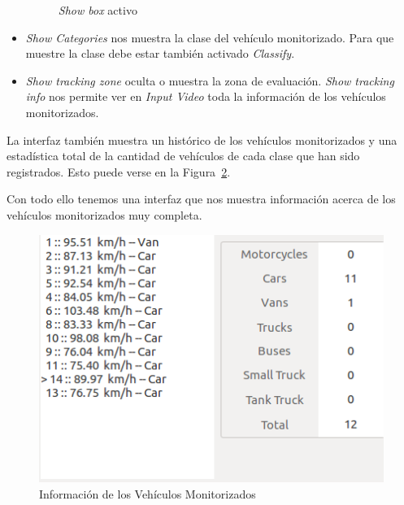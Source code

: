 \begin{itemize}
\begin{figure}[H]
\begin{center}
       \caption{\textit{Show box} activo}
    	\label{fig.show_box}
    \end{center}
    \end{figure}
    \item \textit{Show Categories} nos muestra la clase del vehículo monitorizado. Para que muestre la clase debe estar también activado \textit{Classify}.
    \item \textit{Show tracking zone} oculta o muestra la zona de evaluación.
    \textit{Show tracking info} nos permite ver en \textit{Input Video} toda la información de los vehículos monitorizados.
\end{itemize}

La interfaz también muestra un histórico de los vehículos monitorizados y una estadística total de la cantidad de vehículos de cada clase que han sido registrados. Esto puede verse en la Figura~\ref{fig.info_vehicles}.

    
Con todo ello tenemos una interfaz que nos muestra información acerca de los vehículos monitorizados muy completa.


    \begin{figure}[H] 
    \begin{center}
    	\includegraphics[scale=0.6]{figures/Diseno_global/info.png}
       \caption{Información de los Vehículos Monitorizados}
    	\label{fig.info_vehicles}
    \end{center}
    \end{figure}
    
